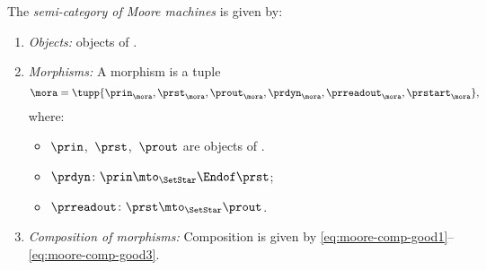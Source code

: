 \begin{definition}[\Moore]
    \label{def:Moore}
    The \emph{semi-category of Moore machines} \Moore is given by:
    \begin{enumerate}
        \item \emph{Objects:} objects of \SetStar.
        \item \emph{Morphisms:} A morphism is a tuple
        \begin{equation}
            \mora = \tupp{\prin_{\mora},\prst_{\mora},\prout_{\mora},\prdyn_{\mora},\prreadout_{\mora},\prstart_{\mora}},
        \end{equation}
        where:
        \begin{itemize}
            \item $\prin$,~$\prst$,~$\prout$ are objects of \SetStar.
            \item $ \prdyn \colon \prin \mto_\SetStar  \Endof \prst$;
            \item $ \prreadout \colon \prst  \mto_\SetStar \prout$.
        \end{itemize}
        \item \emph{Composition of morphisms:} Composition is given by
        \cref{eq:moore-comp-good1}--\cref{eq:moore-comp-good3}.

\end{enumerate}
\end{definition}
